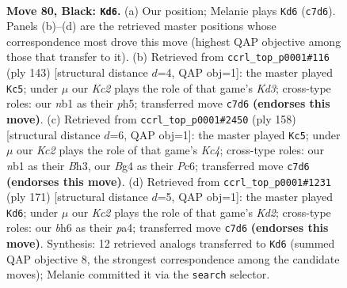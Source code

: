 \documentclass[11pt]{article}
\begin{document}
\clearpage

\begin{figure}[p]\centering
\begin{subfigure}{0.46\textwidth}\centering
\resizebox{\linewidth}{!}{%
\newchessgame
\chessboard[
  setfen={8/2k5/7B/8/p1p3b1/8/5K2/1N6 b - - 15 80},
  showmover=false,
  pgfstyle=straightmove, color=movearrow, markmove={c7-d6}
]}
\caption{}
\end{subfigure}\hfill
\begin{subfigure}{0.46\textwidth}\centering
\resizebox{\linewidth}{!}{%
\newchessgame
\chessboard[
  setfen={8/8/3k3p/7P/1p6/1B1K4/1b6/8 b - - 2 72},
  showmover=false,
  pgfstyle=straightmove, color=movearrow, markmove={d6-c5}
]}
\caption{}
\end{subfigure}
\\[4pt]
\begin{subfigure}{0.46\textwidth}\centering
\resizebox{\linewidth}{!}{%
\newchessgame
\chessboard[
  setfen={8/2b1k3/2P5/8/2K4p/7B/8/8 w - - 5 80},
  showmover=false,
  pgfstyle=straightmove, color=movearrow, markmove={c4-c5}
]}
\caption{}
\end{subfigure}\hfill
\begin{subfigure}{0.46\textwidth}\centering
\resizebox{\linewidth}{!}{%
\newchessgame
\chessboard[
  setfen={8/3k4/8/p7/P7/3N4/4p3/K7 b - - 17 86},
  showmover=false,
  pgfstyle=straightmove, color=movearrow, markmove={d7-d6}
]}
\caption{}
\end{subfigure}
\caption{\textbf{Move 80, Black: \texttt{Kd6}.} (a) Our position; Melanie plays \texttt{Kd6} (\texttt{c7d6}). Panels (b)--(d) are the retrieved master positions whose correspondence most drove this move (highest QAP objective among those that transfer to it). (b) Retrieved from \texttt{ccrl\_top\_p0001\#116} (ply 143) [structural distance $d$=4, QAP obj=1]: the master played \texttt{Kc5}; under $\mu$ our \emph{Kc2} plays the role of that game's \emph{Kd3}; cross-type roles: our \emph{n}b1 as their \emph{p}h5; transferred move \texttt{c7d6} \textbf{(endorses this move)}. (c) Retrieved from \texttt{ccrl\_top\_p0001\#2450} (ply 158) [structural distance $d$=6, QAP obj=1]: the master played \texttt{Kc5}; under $\mu$ our \emph{Kc2} plays the role of that game's \emph{Kc4}; cross-type roles: our \emph{n}b1 as their \emph{B}h3, our \emph{B}g4 as their \emph{P}c6; transferred move \texttt{c7d6} \textbf{(endorses this move)}. (d) Retrieved from \texttt{ccrl\_top\_p0001\#1231} (ply 171) [structural distance $d$=5, QAP obj=1]: the master played \texttt{Kd6}; under $\mu$ our \emph{Kc2} plays the role of that game's \emph{Kd2}; cross-type roles: our \emph{b}h6 as their \emph{p}a4; transferred move \texttt{c7d6} \textbf{(endorses this move)}. Synthesis: 12 retrieved analogs transferred to \texttt{Kd6} (summed QAP objective 8, the strongest correspondence among the candidate moves); Melanie committed it via the \texttt{search} selector.}
\label{fig:thought-m159}
\end{figure}
\end{document}
